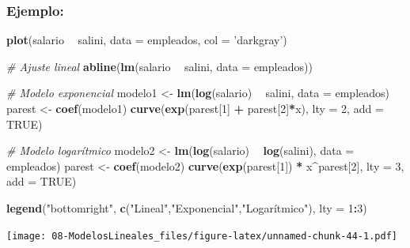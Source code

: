 \documentclass[]{book}
\newenvironment{Shaded}{\begin{snugshade}}{\end{snugshade}}
\newcommand{\KeywordTok}[1]{\textcolor[rgb]{0.13,0.29,0.53}{\textbf{#1}}}
\newcommand{\DataTypeTok}[1]{\textcolor[rgb]{0.13,0.29,0.53}{#1}}
\newcommand{\DecValTok}[1]{\textcolor[rgb]{0.00,0.00,0.81}{#1}}
\newcommand{\StringTok}[1]{\textcolor[rgb]{0.31,0.60,0.02}{#1}}
\newcommand{\CommentTok}[1]{\textcolor[rgb]{0.56,0.35,0.01}{\textit{#1}}}
\newcommand{\OtherTok}[1]{\textcolor[rgb]{0.56,0.35,0.01}{#1}}
\newcommand{\OperatorTok}[1]{\textcolor[rgb]{0.81,0.36,0.00}{\textbf{#1}}}
\newcommand{\NormalTok}[1]{#1}
\begin{document}
\subsubsection{Ejemplo:}\label{ejemplo-1}

\begin{Shaded}
\begin{Highlighting}[]
\KeywordTok{plot}\NormalTok{(salario }\OperatorTok{~}\StringTok{ }\NormalTok{salini, }\DataTypeTok{data =}\NormalTok{ empleados, }\DataTypeTok{col =} \StringTok{'darkgray'}\NormalTok{)}

\CommentTok{# Ajuste lineal}
\KeywordTok{abline}\NormalTok{(}\KeywordTok{lm}\NormalTok{(salario }\OperatorTok{~}\StringTok{ }\NormalTok{salini, }\DataTypeTok{data =}\NormalTok{ empleados)) }

\CommentTok{# Modelo exponencial}
\NormalTok{modelo1 <-}\StringTok{ }\KeywordTok{lm}\NormalTok{(}\KeywordTok{log}\NormalTok{(salario) }\OperatorTok{~}\StringTok{ }\NormalTok{salini, }\DataTypeTok{data =}\NormalTok{ empleados)}
\NormalTok{parest <-}\StringTok{ }\KeywordTok{coef}\NormalTok{(modelo1)}
\KeywordTok{curve}\NormalTok{(}\KeywordTok{exp}\NormalTok{(parest[}\DecValTok{1}\NormalTok{] }\OperatorTok{+}\StringTok{ }\NormalTok{parest[}\DecValTok{2}\NormalTok{]}\OperatorTok{*}\NormalTok{x), }\DataTypeTok{lty =} \DecValTok{2}\NormalTok{, }\DataTypeTok{add =} \OtherTok{TRUE}\NormalTok{)}

\CommentTok{# Modelo logarítmico}
\NormalTok{modelo2 <-}\StringTok{ }\KeywordTok{lm}\NormalTok{(}\KeywordTok{log}\NormalTok{(salario) }\OperatorTok{~}\StringTok{ }\KeywordTok{log}\NormalTok{(salini), }\DataTypeTok{data =}\NormalTok{ empleados)}
\NormalTok{parest <-}\StringTok{ }\KeywordTok{coef}\NormalTok{(modelo2)}
\KeywordTok{curve}\NormalTok{(}\KeywordTok{exp}\NormalTok{(parest[}\DecValTok{1}\NormalTok{]) }\OperatorTok{*}\StringTok{ }\NormalTok{x}\OperatorTok{^}\NormalTok{parest[}\DecValTok{2}\NormalTok{], }\DataTypeTok{lty =} \DecValTok{3}\NormalTok{, }\DataTypeTok{add =} \OtherTok{TRUE}\NormalTok{)}

\KeywordTok{legend}\NormalTok{(}\StringTok{"bottomright"}\NormalTok{, }\KeywordTok{c}\NormalTok{(}\StringTok{"Lineal"}\NormalTok{,}\StringTok{"Exponencial"}\NormalTok{,}\StringTok{"Logarítmico"}\NormalTok{), }\DataTypeTok{lty =} \DecValTok{1}\OperatorTok{:}\DecValTok{3}\NormalTok{)}
\end{Highlighting}
\end{Shaded}

\texttt{[image: 08-ModelosLineales\_files/figure-latex/unnamed-chunk-44-1.pdf]}
\end{document}
